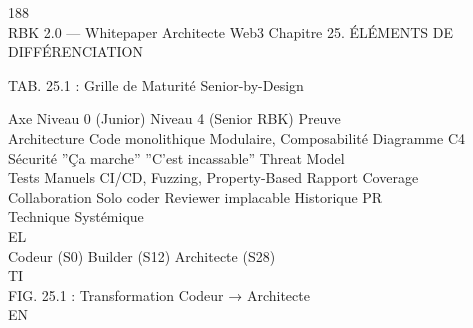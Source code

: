 \vspace{0.5em}
188\\
RBK 2.0 — Whitepaper Architecte Web3                                                            Chapitre 25. ÉLÉMENTS DE DIFFÉRENCIATION\\
\vspace{0.5em}
\vspace{0.5em}
\begin{center}\begin{tabular}TAB. 25.1 : Grille de Maturité Senior-by-Design\end{tabular}\end{center}
\vspace{0.5em}
\vspace{0.5em}
Axe           Niveau 0 (Junior) Niveau 4 (Senior RBK)          Preuve\\
Architecture Code monolithique Modulaire, Composabilité        Diagramme C4\\
Sécurité      ”Ça marche”       ”C’est incassable”             Threat Model\\
Tests         Manuels           CI/CD, Fuzzing, Property-Based Rapport Coverage\\
Collaboration Solo coder        Reviewer implacable            Historique PR\\
\vspace{0.5em}
\vspace{0.5em}
\vspace{0.5em}
\vspace{0.5em}
Technique          Systémique\\
\vspace{0.5em}
\vspace{0.5em}
\vspace{0.5em}
\vspace{0.5em}
EL\\
Codeur (S0)      Builder (S12)      Architecte (S28)\\
\vspace{0.5em}
\vspace{0.5em}
\vspace{0.5em}
\vspace{0.5em}
TI\\
FIG. 25.1 : Transformation Codeur → Architecte\\
\vspace{0.5em}
\vspace{0.5em}
\vspace{0.5em}
\vspace{0.5em}
EN\\
